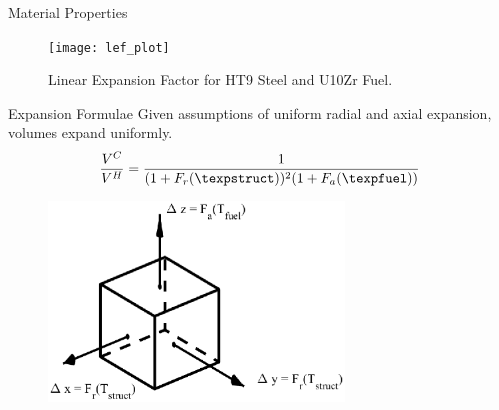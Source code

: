 \begin{frame}{Material Properties}
  \begin{figure}
    \centering
    \texttt{[image: lef\_plot]}
    \caption{Linear Expansion Factor for HT9 Steel and U10Zr Fuel.}
    \label{fig:lef_plot}
  \end{figure}
\end{frame}

\begin{frame}{Expansion Formulae}
  Given assumptions of uniform radial and axial expansion, volumes expand
  uniformly.
  \begin{equation}
    \label{eq:volume_ratio}
    \frac{V^C}{V^H} = \frac{1}{(1+F_r(\texpstruct))^2 (1+F_a(\texpfuel))}
  \end{equation}

  \begin{figure}
    \centering
    \includegraphics[width=0.7\textwidth]{./figs/thexp_figure}
    \label{fig:thexp_figure}
  \end{figure}

\end{frame}

